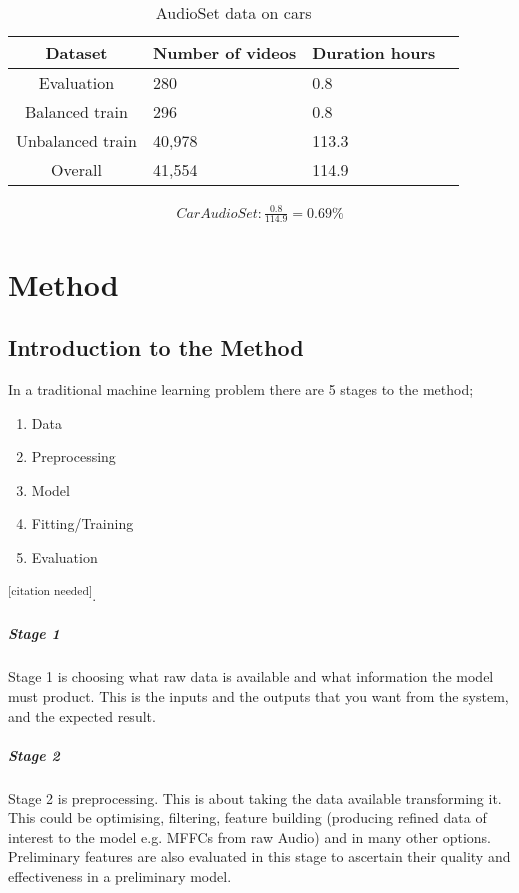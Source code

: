 \documentclass{UoNMCHA}
\newcommand{\citationneeded}{\textsuperscript{\color{blue} [citation needed]}}
\numberwithin{equation}{section}
\begin{document}
\begin{table}[h!]
    \begin{center}
        \caption{AudioSet data on cars}\label{tab:AudioSetCars}
        {\footnotesize
            \begin{tabular}{c l l l|}
                \hline\hline Dataset & Number of videos & Duration hours \\ \hline 
                Evaluation & 280 & 0.8 \\
                Balanced train & 296 & 0.8 \\
                Unbalanced train & 40,978 & 113.3 \\
                Overall & 41,554 & 114.9 \\
                \hline
            \end{tabular}
        }
    \end{center}
\end{table}
\begin{gather*}
    Car AudioSet:  \frac{0.8}{114.9}=0.69\%
\end{gather*}

\section{Method}
\subsection{Introduction to the Method}
In a traditional machine learning problem there are 5 stages to the method; 

\begin{enumerate}[start=1,label={Stage \arabic*:}]
    \item Data
    \item Preprocessing
    \item Model
    \item Fitting/Training
    \item Evaluation
\end{enumerate}

\citationneeded.

\subparagraph{Stage 1}
Stage 1 is choosing what raw data is available and what information the model must product. This is the inputs and the outputs that you want from the system, and the expected result.

\subparagraph{Stage 2}
Stage 2 is preprocessing. This is about taking the data available transforming it. This could be optimising, filtering, feature building (producing refined data of interest to the model e.g. MFFCs from raw Audio) and in many other options. Preliminary features are also evaluated in this stage to ascertain their quality and effectiveness in a preliminary model.
\end{document}
